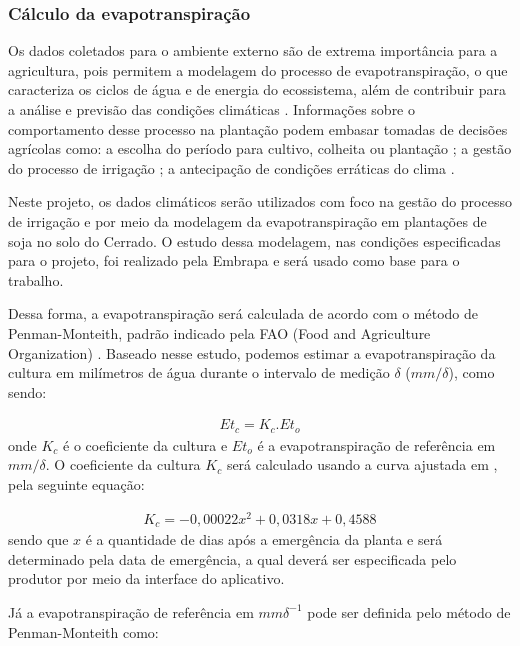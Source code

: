 		\subsubsection{Cálculo da evapotranspiração}

			Os dados coletados para o ambiente externo são de extrema importância para a agricultura, pois permitem a modelagem do processo de evapotranspiração, o que caracteriza os ciclos de água e de energia do ecossistema, além de contribuir para a análise e previsão das condições climáticas \cite{bib_sen_04_victor}. Informações sobre o comportamento desse processo na plantação podem embasar tomadas de decisões agrícolas como: a escolha do período para cultivo, colheita ou plantação \cite{bib_sen_05_victor}; a gestão do processo de irrigação \cite{bib_sen_06_victor}; a antecipação de condições erráticas do clima \cite{bib_sen_07_victor}.

			Neste projeto, os dados climáticos serão utilizados com foco na gestão do processo de irrigação e por meio da modelagem da evapotranspiração em plantações de soja no solo do Cerrado. O estudo dessa modelagem, nas condições especificadas para o projeto, foi realizado pela Embrapa \cite{bib_sen_01_victor} e será usado como base para o trabalho. 

			Dessa forma, a evapotranspiração será calculada de acordo com o método de Penman-Monteith, padrão indicado pela FAO (Food and Agriculture Organization) \cite{bib_sen_02_victor}. Baseado nesse estudo, podemos estimar a evapotranspiração da cultura em milímetros de água durante o intervalo de medição $\delta$ ($mm/\delta$), como sendo:

			\begin{eqnarray}
				Et_c = K_c.Et_o
			\end{eqnarray}
			onde $K_c$ é o coeficiente da cultura e $Et_o$ é a evapotranspiração de referência em $mm/\delta$. O coeficiente da cultura $K_c$  será calculado usando a curva ajustada em \cite{bib_sen_03_victor}, pela seguinte equação:

			\begin{eqnarray}
				K_c = -0,00022x^2 + 0,0318x + 0,4588
			\end{eqnarray}
			sendo que $x$ é a quantidade de dias após a emergência da planta e será determinado pela data de emergência, a qual deverá ser especificada pelo produtor por meio da interface do aplicativo. 

			Já a evapotranspiração de referência em $mm \delta ^{-1}$ pode ser definida pelo método de Penman-Monteith como:

